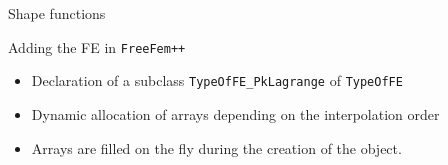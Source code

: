 \documentclass[8pt, xcolor=table,aspectratio=169]{beamer}
\begin{document}
\begin{frame}[fragile]{Shape functions}
  \begin{minipage}{60mm}
          \begin{figure}
        
         \resizebox{\textwidth}{!}{%
    
         }


    \end{figure}
\end{minipage}
\hspace{0.001cm}
\begin{minipage}{60mm}
\end{minipage}

\end{frame}
\begin{frame}{Adding the FE in \texttt{FreeFem++}}
  \vspace{0.5cm}
  \begin{itemize}[label=$\square$, itemsep=5mm]
    \item Declaration of a subclass \texttt{TypeOfFE\_PkLagrange} of \texttt{TypeOfFE}
    \item Dynamic allocation of arrays depending on the interpolation order
    \item Arrays are filled on the fly during the creation of the object.

  \end{itemize}

\end{frame}
\end{document}
